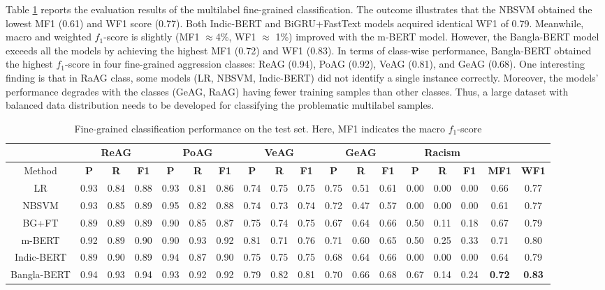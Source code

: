 \documentclass[11pt]{article}
\begin{document}
Table \ref{fg} reports the evaluation results of the multilabel fine-grained classification. The outcome illustrates that the NBSVM obtained the lowest MF1 (0.61) and WF1 score (0.77). Both Indic-BERT and BiGRU+FastText models acquired identical WF1 of 0.79. Meanwhile, macro and weighted $f_1$-score is slightly (MF1 $\approx$4\%, WF1 $\approx$ 1\%) improved with the m-BERT model. However, the Bangla-BERT model exceeds all the models by achieving the highest MF1 (0.72) and WF1 (0.83). In terms of class-wise performance, Bangla-BERT obtained the highest $f_1$-score in four fine-grained aggression classes: ReAG (0.94), PoAG (0.92), VeAG (0.81), and GeAG (0.68). One interesting finding is that in RaAG class, some models (LR, NBSVM, Indic-BERT) did not identify a single instance correctly. Moreover, the models' performance degrades with the classes (GeAG, RaAG) having fewer training samples than other classes. Thus, a large dataset with balanced data distribution needs to be developed for classifying the problematic multilabel samples. 

\begin{table}[h!]
\centering
\renewcommand*{\arraystretch}{1.1}
\scriptsize
\begin{tabular}{cccc|ccc|ccc|ccc|ccc|cc}

 & \multicolumn{3}{c}{\textbf{ReAG}}& \multicolumn{3}{c}{\textbf{PoAG}}& \multicolumn{3}{c}{\textbf{VeAG}} & \multicolumn{3}{c}{\textbf{GeAG}} & \multicolumn{3}{c}{\textbf{Racism}} \\
\hline
Method &\textbf{P}&\textbf{R}&\textbf{F1}&\textbf{P}&\textbf{R}&\textbf{F1}&\textbf{P}&\textbf{R}&\textbf{F1}&\textbf{P}&\textbf{R}&\textbf{F1}&\textbf{P}&\textbf{R}&\textbf{F1}&\textbf{MF1}&\textbf{WF1}\\
\hline
LR & 0.93 & 0.84& 0.88 & 0.93 & 0.81 & 0.86 &  0.74 & 0.75 & 0.75 & 0.75 & 0.51 & 0.61 & 0.00 & 0.00 & 0.00 & 0.66 & 0.77  \\

NBSVM & 0.93 & 0.85 & 0.89 & 0.95 & 0.82 & 0.88 & 0.74 & 0.73 & 0.74 & 0.72 & 0.47 & 0.57 & 0.00 & 0.00 & 0.00 & 0.61 & 0.77   \\

BG+FT & 0.89 & 0.89 & 0.89 & 0.90 & 0.85 & 0.87 & 0.75 & 0.74 & 0.75 & 0.67 & 0.64 & 0.66 & 0.50 & 0.11 & 0.18 & 0.67 & 0.79   \\

m-BERT & 0.92 & 0.89 & 0.90 & 0.90 & 0.93 & 0.92 & 0.81 & 0.71 & 0.76 & 0.71 & 0.60 & 0.65 & 0.50 & 0.25 & 0.33 & 0.71 & 0.80 \\

Indic-BERT &  0.89 & 0.90 & 0.89 & 0.94 & 0.87 & 0.90 & 0.75 & 0.75 & 0.75 & 0.68 & 0.64 & 0.66 & 0.00 & 0.00 &      0.00 & 0.64 & 0.79  \\

Bangla-BERT &  0.94 & 0.93 & 0.94 & 0.93 & 0.92 & 0.92 & 0.79 & 0.82 & 0.81 & 0.70 & 0.66    & 0.68 & 0.67 & 0.14 & 0.24 & \textbf{0.72} & \textbf{0.83}  \\

\hline            
\end{tabular}
\caption{\label{fg}{Fine-grained classification performance on the test set. Here, MF1 indicates the macro $f_1$-score}
}
\end{table}
\end{document}
